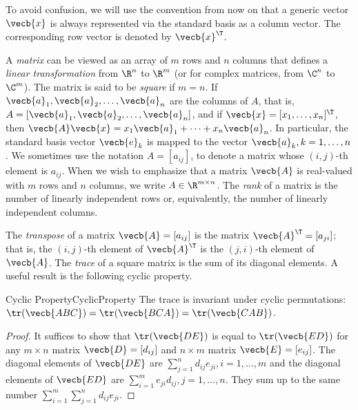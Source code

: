 \begin{xattention}
	To avoid confusion, we will use the convention from now on that a generic vector $\vecb{x}$ is always represented via the standard basis as a column vector. The corresponding row vector is denoted by $\vecb{x}^\T$.
\end{xattention}

A \textit{matrix} can be viewed as an array of $m$ rows and $n$ columns that defines a \textit{linear transformation} from $\R^n$ to $\R^m$ (or for complex matrices, from $\C^n$ to $\C^m$). The matrix is said to be \textit{square} if $m = n$. If $\vecb{a}_1, \vecb{a}_2, \dots, \vecb{a}_n$ are the columns of $A$, that is, $A = [\vecb{a}_1, \vecb{a}_2, \dots, \vecb{a}_n]$, and if $\vecb{x} = [x_1, \dots, x_n]^\T$, then $\vecb{A}\vecb{x} = x_1 \vecb{a}_1 + \dots + x_n \vecb{a}_n$. In particular, the standard basis vector $\vecb{e}_k$ is mapped to the vector $\vecb{a}_k, k = 1, \dots, n$. We sometimes use the notation $A = [a_{ij}]$, to denote a matrix whose $(i, j)$-th element is $a_{ij}$. When we wish to emphasize that a matrix $\vecb{A}$ is real-valued with $m$ rows and $n$ columns, we write $A \in \R^{m \times n}$. The \textit{rank} of a matrix is the number of linearly independent rows or, equivalently, the number of linearly independent columns.

The \textit{transpose} of a matrix $\vecb{A} = [a_{ij}]$ is the matrix $\vecb{A}^\T = [a_{ji}]$; that is, the $(i, j)$-th element of $\vecb{A}^\T$ is the $(j, i)$-th element of $\vecb{A}$. The \textit{trace} of a square matrix is the sum of its diagonal elements. A useful result is the following cyclic property.

\begin{thm}{Cyclic Property}{CyclicProperty}
	The trace is invariant under cyclic permutations: $\tr(\vecb{ABC}) = \tr(\vecb{BCA}) = \tr(\vecb{CAB})$.
\end{thm}

\begin{proof}
	It suffices to show that $\tr(\vecb{DE})$ is equal to $\tr(\vecb{ED})$ for any $m \times n$ matrix $\vecb{D} = [d_{ij}]$ and $n \times m$ matrix $\vecb{E} = [e_{ij}]$. The diagonal elements of $\vecb{DE}$ are $\sum_{j=1}^n d_{ij} e_{ji}, i = 1, \dots, m$ and the diagonal elements of $\vecb{ED}$ are $\sum_{i=1}^m e_{ji} d_{ij}, j = 1, \dots, n$. They sum up to the same number $\sum_{i=1}^m \sum_{j=1}^n d_{ij} e_{ji}$.
\end{proof}

